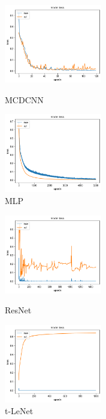 \documentclass[conference]{IEEEtran}
\begin{document}
\begin{figure}[H]
  \centering
  \begin{minipage}[b]{4.25cm}
    \includegraphics[width=4.25cm]{mcdcnnepochs_loss}
    \caption{MCDCNN}
    \label{fig:mcdcnn}
  \end{minipage}
  \hfill
  \begin{minipage}[b]{4.25cm}
    \includegraphics[width=4.25cm]{mlpepochs_loss}
    \caption{MLP}
    \label{fig:mlp}
  \end{minipage}
\end{figure}

\begin{figure}[H]
  \centering
  \begin{minipage}[b]{4.25cm}
    \includegraphics[width=4.25cm]{resnetepochs_loss}
    \caption{ResNet}
    \label{fig:resnet}
  \end{minipage}
  \hfill
  \begin{minipage}[b]{4.25cm}
    \includegraphics[width=4.25cm]{tlenetepochs_loss}
    \caption{t-LeNet}
    \label{fig:tlenet}
  \end{minipage}
\end{figure}
\end{document}
